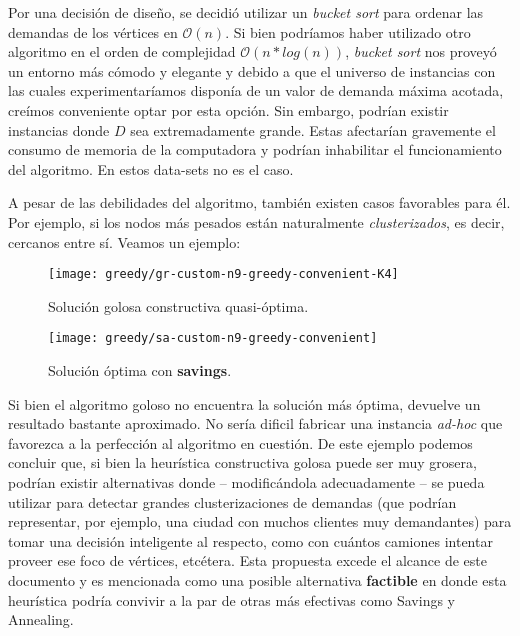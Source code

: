 Por una decisión de diseño, se decidió utilizar un \textit{bucket sort} para ordenar las demandas de los vértices en $\mathcal{O}(n)$. Si bien podríamos haber utilizado otro algoritmo en el orden de complejidad $\mathcal{O}(n*log(n))$, \textit{bucket sort} nos proveyó un entorno más cómodo y elegante y debido a que el universo de instancias con las cuales experimentaríamos disponía de un valor de demanda máxima acotada, creímos conveniente optar por esta opción. Sin embargo, podrían existir instancias donde $D$ sea extremadamente grande. Estas afectarían gravemente el consumo de memoria de la computadora y podrían inhabilitar el funcionamiento del algoritmo. En estos data-sets no es el caso.

A pesar de las debilidades del algoritmo, también existen casos favorables para él. Por ejemplo, si los nodos más pesados están naturalmente \textit{clusterizados}, es decir, cercanos entre sí. Veamos un ejemplo:

\begin{figure}[H]
	\centering
	\begin{minipage}{0.48\textwidth}
		\centering
		\texttt{[image: greedy/gr-custom-n9-greedy-convenient-K4]}
		\caption{\footnotesize Solución golosa constructiva quasi-óptima.}
		\label{fig:gr-custom-n9-greedy-convenient-K4}
	\end{minipage}%
	\hspace{0.03\textwidth}
	\begin{minipage}{0.48\textwidth}
		\centering
		\texttt{[image: greedy/sa-custom-n9-greedy-convenient]}
		\caption{\footnotesize Solución óptima con \textbf{savings}.}
		\label{fig:sa-custom-n9-greedy-convenient}
	\end{minipage}%
\end{figure}

Si bien el algoritmo goloso no encuentra la solución más óptima, devuelve un resultado bastante aproximado. No sería dificil fabricar una instancia \textit{ad-hoc} que favorezca a la perfección al algoritmo en cuestión. De este ejemplo podemos concluir que, si bien la heurística constructiva golosa puede ser muy grosera, podrían existir alternativas donde – modificándola adecuadamente – se pueda utilizar para detectar grandes clusterizaciones de demandas (que podrían representar, por ejemplo, una ciudad con muchos clientes muy demandantes) para tomar una decisión inteligente al respecto, como con cuántos camiones intentar proveer ese foco de vértices, etcétera. Esta propuesta excede el alcance de este documento y es mencionada como una posible alternativa \textbf{factible} en donde esta heurística podría convivir a la par de otras más efectivas como Savings y Annealing.
